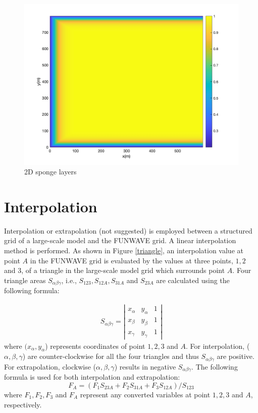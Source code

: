 \documentclass[preprint,10pt]{elsarticle}
\newcommand{\be}{\begin{equation}}
\newcommand{\ee}{\end{equation}}
\newcommand{\ba}{\begin{eqnarray}}
\newcommand{\ea}{\end{eqnarray}}
\begin{document}
  \begin{figure}
\begin{center}
 \includegraphics[width=1.0\textwidth]{figures/sponge_2d.jpg}
 \caption{2D sponge layers }
 \label{sponge}
 \end{center}
 \end{figure}
 
 \section{Interpolation} 
  
  Interpolation or extrapolation (not suggested) is  employed between a structured grid of a large-scale model
 and the FUNWAVE grid.  A linear interpolation method is performed.
As shown in Figure \ref{triangle}, an interpolation
value at  point $A$ in the FUNWAVE grid is evaluated by the values at three points, $1,
2$ and $3$, of a triangle in the large-scale model grid which surrounds point $A$.  Four triangle areas
$S_{\alpha \beta \gamma}$, i.e., $S_{123}, S_{12A}, S_{31A}$ and $S_{23A}$ are
calculated using the following formula:
  
\ba
S_{\alpha \beta \gamma}=\left | \begin{array}{ccc}x_\alpha & y_\alpha & 1 \\
x_\beta & y_\beta & 1 \\
x_\gamma & y_\gamma &1 
\end{array}
\right |
\ea
where $(x_{\alpha}, y_{\alpha}$) represents
coordinates of point $1, 2, 3$ and $A$.  For interpolation, ($\alpha, \beta,
\gamma$) are  counter-clockwise for all the four triangles and thus $S_{\alpha
\beta \gamma}$ are positive. For extrapolation, clockwise ($\alpha, \beta,
\gamma$) results in negative $S_{\alpha
\beta \gamma}$. The following formula is used for both interpolation and
extrapolation:
\be
F_A=(F_1S_{23A}+F_2 S_{31A} + F_3 S_{12A})/S_{123}
\ee
where $F_1, F_2, F_3$ and $F_A$ represent any converted variables at
point $1, 2, 3 $ and $A$, respectively.
\end{document}
